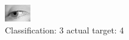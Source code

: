 \begin{figure}[h!]
\begin{center}
\includegraphics[width=0.60\columnwidth]{figures/ID2903_class_3_target_4.png}
\end{center}
\caption{ Classification: 3 actual target: 4}
\label{fig:ID2903_class_3_target_4}
\end{figure}
